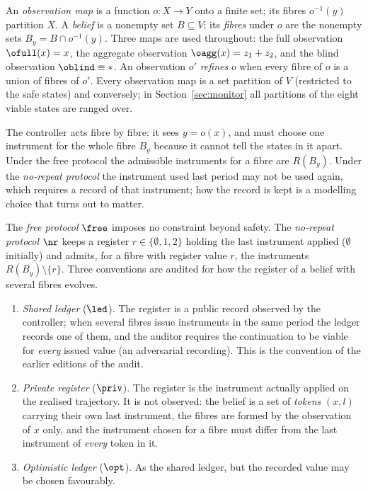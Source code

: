 \begin{definition}\label{def:obs}
An \emph{observation map} is a function $o:X\to Y$ onto a finite set; its fibres $o^{-1}(y)$ partition $X$. A \emph{belief} is a nonempty set $B\subseteq V$; its \emph{fibres} under $o$ are the nonempty sets $B_y=B\cap o^{-1}(y)$. Three maps are used throughout: the full observation $\ofull(x)=x$, the aggregate observation $\oagg(x)=z_1+z_2$, and the blind observation $\oblind\equiv\ast$. An observation $o'$ \emph{refines} $o$ when every fibre of $o$ is a union of fibres of $o'$. Every observation map is a set partition of $V$ (restricted to the safe states) and conversely; in Section~\ref{sec:monitor} all partitions of the eight viable states are ranged over.
\end{definition}

The controller acts fibre by fibre: it sees $y=o(x)$, and must choose one instrument for the whole fibre $B_y$ because it cannot tell the states in it apart. Under the free protocol the admissible instruments for a fibre are $R(B_y)$. Under the \emph{no-repeat protocol} the instrument used last period may not be used again, which requires a record of that instrument; how the record is kept is a modelling choice that turns out to matter.

\begin{definition}\label{def:protocol}
The \emph{free protocol} $\free$ imposes no constraint beyond safety. The \emph{no-repeat protocol} $\nr$ keeps a register $r\in\{\emptyset,1,2\}$ holding the last instrument applied ($\emptyset$ initially) and admits, for a fibre with register value $r$, the instruments $R(B_y)\setminus\{r\}$. Three conventions are audited for how the register of a belief with several fibres evolves.
\begin{enumerate}[leftmargin=2em,itemsep=1pt]
\item \emph{Shared ledger} ($\led$). The register is a public record observed by the controller; when several fibres issue instruments in the same period the ledger records one of them, and the auditor requires the continuation to be viable for \emph{every} issued value (an adversarial recording). This is the convention of the earlier editions of the audit.
\item \emph{Private register} ($\priv$). The register is the instrument actually applied on the realised trajectory. It is not observed: the belief is a set of \emph{tokens} $(x,l)$ carrying their own last instrument, the fibres are formed by the observation of $x$ only, and the instrument chosen for a fibre must differ from the last instrument of \emph{every} token in it.
\item \emph{Optimistic ledger} ($\opt$). As the shared ledger, but the recorded value may be chosen favourably.
\end{enumerate}
\end{definition}

